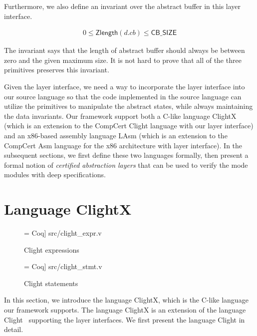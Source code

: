 Furthermore, we also define an invariant over the abstract buffer
in this layer interface.

\begin{invariant}
\begin{align*}
0 \leq \textsf{Zlength} (d.cb) \leq \textsf{CB\_SIZE}
\end{align*}
\end{invariant}

The invariant says that the length of abstract buffer should always
be between zero and the given maximum size.
It is not hard to prove that all of the three primitives preserves
this invariant.

Given the layer interface, we need a way to incorporate the layer interface
into our source language so that the code implemented in the source language
can utilize the primitives to manipulate the abstract states, while always
maintaining the data invariants. Our framework support both a C-like
language ClightX (which is an extension to the CompCert Clight language
with our layer interface) and an x86-based assembly language LAsm
(which is an extension to the CompCert Asm language for the x86
architecture with layer interface). In the subsequent sections,
we first define these two languages formally, then present
a formal notion of {\em certified abstraction layers} that can be used
to verify the mode modules with deep specifications.



\section{Language ClightX}

\begin{figure}
 = Coq] {src/clight_expr.v}
\caption{Clight expressions}
\label{fig:clight_expr}
\end{figure}

\begin{figure}
 = Coq] {src/clight_stmt.v}
\caption{Clight statements}
\label{fig:clight_stmt}
\end{figure}

In this section, we introduce the language ClightX, which is the C-like
language our framework supports. 
The language ClightX is an extension of the language Clight~\cite{blazy-leroy-clight}
supporting the layer interfaces. We first present the language Clight in detail.

